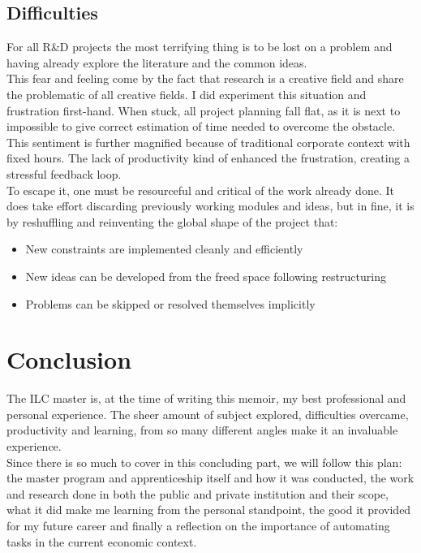 \documentclass[12pt]{memoir}
\begin{document}
\subsection{Difficulties}
For all R\&D projects the most terrifying thing is to be lost on a problem and
having already explore the literature and the common ideas.\\
This fear and feeling come by the fact that research is a creative field and share the
problematic of all creative fields. I did experiment this situation and frustration first-hand.
When stuck, all project planning fall flat, as it is next to impossible to give correct estimation
of time needed to overcome the obstacle. This sentiment is further magnified because of traditional corporate
context with fixed hours. The lack of productivity kind of enhanced the frustration,
creating a stressful feedback loop.\\
To escape it, one must be resourceful and critical of the work already done. It does take effort discarding previously
working modules and ideas, but in fine, it is by reshuffling and reinventing the global shape of the project that:
\begin{itemize}
  \item New constraints are implemented cleanly and efficiently
  \item New ideas can be developed from the freed space following restructuring
  \item Problems can be skipped or resolved themselves implicitly
\end{itemize}
    

\section{Conclusion}

The ILC master is, at the time of writing this memoir, my best professional and personal experience.
The sheer amount of subject explored, difficulties overcame, productivity and learning, from so many
different angles make it an invaluable experience.\\
Since there is so much to cover in this concluding part, we will follow this plan: the master program and apprenticeship
itself and how it was conducted, the work and research done in both the public and private institution and their scope,
what it did make me learning from the personal standpoint, the good it provided for my future career and finally a
reflection on the importance of automating tasks in the current economic context.\\
\\
\end{document}

